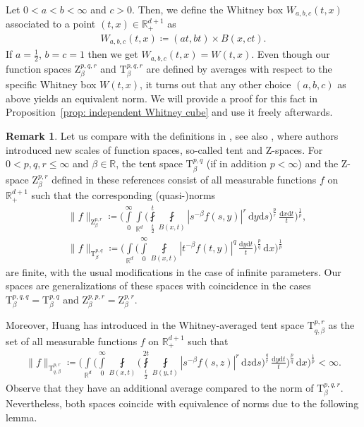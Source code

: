 \documentclass[11pt, leqno,parskip=half]{amsart}
\theoremstyle{definition}
\newtheorem{remark}[theorem]{Remark}
\newcommand{\IR}{\mathbb{R}}
\renewcommand{\T}{\mathrm{T}}
\newcommand{\Z}{\mathrm{Z}}
\renewcommand{\d}{\mathrm{d}}
\numberwithin{equation}{section}
\begin{document}
Let $0<a<b<\infty$ and $c>0$. Then, we define the Whitney box $W_{a,b,c}(t,x)$ associated to a point $(t,x)\in\IR^{d+1}_+$ as
\begin{align*}
    W_{a,b,c}(t,x)\coloneqq (at,bt)\times B(x,ct).
\end{align*}
If $a=\frac{1}{2}$, $b=c=1$ then we get $W_{a,b,c}(t,x) = W(t,x)$.
Even though our function spaces $\Z^{p,q,r}_\beta$ and $\T^{p,q,r}_\beta$ are defined by averages with respect to the specific Whitney box $W(t,x)$, it turns out that any other choice $(a,b,c)$ as above yields an equivalent norm. We will provide a proof for this fact in Proposition~\ref{prop: independent Whitney cube} and use it freely afterwards.


\begin{remark}
\label{rem: comparison of known spaces}
Let us compare with the definitions in \cites{Coifman_Meyer_Stein,Barton_Mayboroda}, see also \cite{Amenta2}, where authors introduced new scales of function spaces, so-called tent and Z-spaces. For $0 < p,q,r \leq \infty$ and $\beta \in \IR$, the tent space $\T^{p,q}_\beta$ (if in addition $p < \infty$) and the $\Z$-space $\Z^{p,r}_\beta$ defined in these references consist of all measurable functions $f$ on $\IR^{d+1}_+$ such that the corresponding (quasi-)norms
    \begin{align*}
        &\|f\|_{\Z^{p,r}_\beta} \coloneqq \bigg(\int\limits_{0}^\infty \int\limits_{\IR^d}\bigg(\fint\limits_{\frac{t}{2}}^t \fint\limits_{B(x,t)} |s^{-\beta}f(s,y)|^r \, \d y \d s\bigg)^\frac{p}{r}\,\frac{\d x\d t}{t}\bigg)^\frac{1}{p},\\
        &\|f\|_{\T^{p,q}_\beta} \coloneqq \bigg( \int\limits_{\IR^d}\bigg(\int\limits_{0}^\infty \fint\limits_{B(x,t)} |t^{-\beta}f(t,y)|^q \, \frac{\d y \d t}{t}\bigg)^\frac{p}{q}\,\d x\bigg)^\frac{1}{p}
    \end{align*}
    are finite, with the usual modifications in the case of infinite parameters. Our spaces are generalizations of these spaces with coincidence in the cases $\T^{p,q,q}_\beta = \T^{p,q}_\beta$ and $\Z^{p,p,r}_\beta =\Z^{p,r}_\beta$.
\end{remark}

Moreover, Huang has introduced in \cite{Huang} the Whitney-averaged tent space $\T^{p,r}_{q,\beta}$ as the set of all measurable functions $f$ on $\IR^{d+1}_+$ such that
\begin{align*}
    \|f\|_{\T^{p,r}_{q,\beta}} \coloneqq \bigg(\int\limits_{\IR^d} \bigg( \int\limits_0^\infty\fint\limits_{B(x,t)} \bigg(\fint\limits_{\frac{t}{2}}^{2t} \fint\limits_{B(y,t)} |s^{-\beta}f(s,z)|^r \,\d z \d s\bigg)^\frac{q}{r}\,\frac{\d y\d t}{t}\bigg)^\frac{p}{q}\,\d x \bigg)^\frac{1}{p} < \infty.
\end{align*}
Observe that they have an additional average compared to the norm of $\T^{p,q,r}_\beta$. Nevertheless, both spaces coincide with equivalence of norms due to the following lemma.
\end{document}
